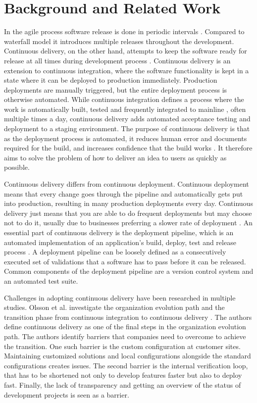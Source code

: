 \documentclass[lnbip]{svmultln}
\begin{document}
\section{Background and Related Work}
In the agile process software release is done in periodic intervals \cite{cockburn2002agile}. Compared to waterfall model it introduces multiple releases throughout the development. Continuous delivery, on the other hand, attempts to keep the software ready for release at all times during development process \cite{cdbook}. Continuous delivery is an extension to continuous integration, where the software functionality is kept in a state where it can be deployed to production immediately. Production deployments are manually triggered, but the entire deployment process is otherwise automated. While continuous integration defines a process where the work is automatically built, tested and frequently integrated to mainline \cite{duvall2007continuous}, often multiple times a day, continuous delivery adds automated acceptance testing and deployment to a staging environment. The purpose of continuous delivery is that as the deployment process is automated, it reduces human error and documents required for the build, and increases confidence that the build works \cite{cdbook}. It therefore aims to solve the problem of how to deliver an idea to users as quickly as possible.

Continuous delivery differs from continuous deployment. Continuous deployment means that every change goes through the pipeline and automatically gets put into production, resulting in many production deployments every day. Continuous delivery just means that you are able to do frequent deployments but may choose not to do it, usually due to businesses preferring a slower rate of deployment \cite{fowler}. An essential part of continuous delivery is the deployment pipeline, which is an automated implementation of an application’s build, deploy, test and release process \cite{humble2006deployment}. A deployment pipeline can be loosely defined as a consecutively executed set of validations that a software has to pass before it can be released. Common components of the deployment pipeline are a version control system and an automated test suite.

Challenges in adopting continuous delivery have been researched in multiple studies. Olsson et al. investigate the organization evolution path and the transition phase from continuous integration to continuous delivery \cite{olsson2012climbing}. The authors define continuous delivery as one of the final steps in the organization evolution path. The authors identify barriers that companies need to overcome to achieve the transition. One such barrier is the custom configuration at customer sites. Maintaining customized solutions and local configurations alongside the standard configurations creates issues. The second barrier is the internal verification loop, that has to be shortened not only to develop features faster but also to deploy fast. Finally, the lack of transparency and getting an overview of the status of development projects is seen as a barrier.
\end{document}
